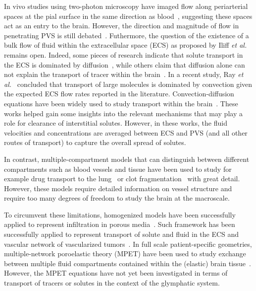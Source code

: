 \documentclass[10pt]{article}
\newcommand{\etal}{\emph{et al.}\;}
\newcommand{\1}{^{(1)}}
\newcommand{\2}{^{(2)}}
\begin{document}
In vivo studies using two-photon microscopy have imaged flow along periarterial spaces at the pial surface in the same direction as blood~\cite{bedussi-2018-paravascular,mestre_flow_2018}, suggesting these spaces act as an entry to the brain. However,  the direction and magnitude of flow in penetrating PVS is still debated~\cite{bakker2019paravascular}. Futhermore, the question of the existence of a bulk flow of fluid within the extracellular space (ECS) as proposed by Iliff \etal~\cite{Iliff_2012_PVS} remains open. Indeed, some pieces of research indicate that solute transport in the ECS is dominated by diffusion~\cite{asgari_glymphatic_2016, Holter9894, smith2019going}, while others claim that diffusion alone can not explain the transport of tracer within the brain~\cite{valnes_apparent_2020, ray2021quantitative}. In a recent study, Ray \etal~\cite{ray_analysis_2019} concluded that transport of large molecules is dominated by convection given the expected ECS flow rates reported in the literature. Convection-diffusion equations have been widely used to study transport within the brain~\cite{ray_analysis_2019,valnes_apparent_2020,Holter9894,nicholson-1981-ion, stoverud_modeling_2012, ray2021quantitative, croci2019uncertainty}. These works helped gain some insights into the relevant mechanisms that may play a role for clearance of interstitial solutes. %
However, in these works, the fluid velocities and concentrations are averaged between ECS and PVS (and all other routes of transport) to capture the overall spread of solutes. 

In contrast, multiple-compartment models that can distinguish between different compartments such as blood vessels and tissue have been used to study for example drug transport to the lung~\cite{Erbertseder-2012-lung} or clot fragmentation~\cite{Payne-clot-2021} with great detail. However, these models require detailed information on vessel structure and require too many degrees of freedom to study the brain at the macroscale. 

To circumvent these limitations, homogenized models have been successfully applied to represent infiltration in porous media~\cite{Hornung-1996-homogenization}. Such framework has been successfully applied to represent transport of solute and fluid in the ECS and vascular network of vascularized tumors~\cite{ shipley_multiscale_2010,shipley-four-comp, Penta-homogenization-2015}.   
In full scale patient-specific geometries, multiple-network poroelastic theory (MPET) have been used to study exchange between multiple fluid compartments contained within the (elastic) brain tissue~\cite{Biot-1941-Consolidation,Biot-1955-Consolidation2, Bai-MPET-1993,tully_ventikos_2011,Vardakis-2016-cerebral,Guo-2018-MPET,Guo-2019-MPET}. However, the MPET equations have not yet been investigated in terms of transport of tracers or solutes in the context of the glymphatic system.
\end{document}
